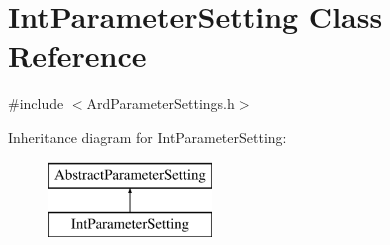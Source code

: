 \hypertarget{class_int_parameter_setting}{\section{Int\-Parameter\-Setting Class Reference}
\label{class_int_parameter_setting}
}


{\ttfamily \#include $<$Ard\-Parameter\-Settings.\-h$>$}

Inheritance diagram for Int\-Parameter\-Setting\-:\begin{figure}[H]
\begin{center}
\leavevmode
\includegraphics[height=2.000000cm]{class_int_parameter_setting}
\end{center}
\end{figure}
